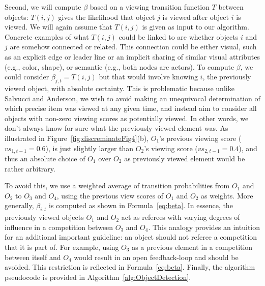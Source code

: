 Second, we will compute $\beta$ based on a viewing transition function $T$ between objects:  $T(i,j)$ gives the likelihood that object $j$ is viewed after object $i$ is viewed. We will again assume that $T(i,j)$ is given as input to our algorithm. Concrete examples of what $T(i,j)$ could be linked to are whether objects $i$ and $j$ are somehow connected or related. This connection could be either visual, such as an explicit edge or leader line or an implicit sharing of similar visual attributes (e.g., color, shape), or semantic (e.g., both nodes are actors). To compute $\beta$, we could consider $\beta_{j,t} = T(i,j)$ but that would involve knowing $i$, the previously viewed object, with absolute certainty. This is problematic because unlike Salvucci and Anderson, we wish to avoid making an unequivocal determination of which precise item was viewed at any given time, and instead aim to consider all objects with non-zero viewing scores as potentially viewed. In other words, we don't always know for sure what the previously viewed element was. As illustrated in Figure~\ref{fig:discreminateFig4}(b), $O_1$'s previous viewing score ($vs_{1,t-1}=0.6$), is just slightly larger than $O_2$'s viewing score ($vs_{2,t-1}=0.4$), and thus an absolute choice of $O_1$ over $O_2$ as previously viewed element would be rather arbitrary.  

To avoid this, we use a weighted average of transition probabilities from $O_1$ and $O_2$ to $O_3$ and $O_4$, using the previous view scores of $O_1$ and $O_2$ as weights.  More generally, $\beta_{i,t}$ is computed as shown in Formula~\ref{eq:beta}. In essence, the previously viewed objects $O_1$ and $O_2$ act as referees with varying degrees of influence in a competition between $O_3$ and $O_4$. This analogy provides an intuition for an additional important guideline: an object should not referee a competition that it is part of. For example, using $O_3$ as a previous element in a competition between itself and $O_4$ would result in an open feedback-loop and should be avoided. This restriction is reflected in Formula~\ref{eq:beta}.  Finally, the algorithm pseudocode is provided in Algorithm~\ref{alg:ObjectDetection}.

